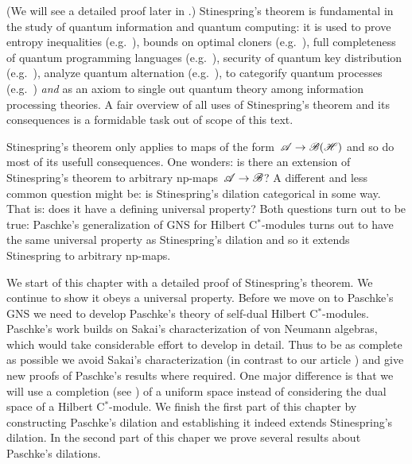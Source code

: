 \documentclass[b]{subfiles}
\begin{document}
\begin{parsec}
\begin{point}%
(We will see a detailed proof later in .)
Stinespring's theorem
is fundamental in the study
of quantum information and quantum computing:
it is used to prove entropy inequalities (e.g.~\cite{lindblad}),
bounds on optimal cloners (e.g.~\cite{werner}),
full completeness of quantum programming languages (e.g.~\cite{staton}),
security of quantum key distribution (e.g.~\cite{werner2}),
analyze quantum alternation (e.g.~\cite{prakash}),
to categorify quantum processes (e.g.~\cite{selinger}) \emph{and}
as an axiom to single out
quantum theory among information processing theories.\cite{chiribella}
A fair overview of all uses of Stinespring's theorem and its consequences
is a formidable task out of scope of this text.

Stinespring's theorem only applies
to maps of the form~$\mathscr{A} \to \mathscr{B}(\mathscr{H})$
    and so do most of its usefull consequences.
One wonders:
    is there an extension of Stinespring's theorem
    to arbitrary np-maps~$\mathscr{A} \to \mathscr{B}$?
A different and less common question might be:
    is Stinespring's dilation categorical in some way.
That is: does it have a defining universal property?
Both questions turn out to be true:
Paschke's generalization of GNS for Hilbert C$^*$-modules\cite{paschke}
    turns out to have the same universal property
        as Stinespring's dilation and so it extends Stinespring
        to arbitrary np-maps.

We start of this chapter with a detailed proof of Stinespring's theorem.
We continue to show it obeys a universal property.
Before we move on to Paschke's GNS
    we need to develop Paschke's theory of self-dual Hilbert C$^*$-modules.
Paschke's work builds on Sakai's characterization of von Neumann algebras,
    which would take considerable effort to develop in detail.
Thus to be as complete as possible
we avoid Sakai's characterization (in contrast to our
    article \cite{wwpaschke})
    and give new proofs
    of Paschke's results where required.
One major difference is that we will use
    a completion (see ) of a uniform space
    instead of considering the dual space of a Hilbert C$^*$-module.
We finish the first part of this chapter
    by constructing Paschke's dilation
    and establishing it indeed extends Stinespring's dilation.
In the second part of this chaper
    we prove several results about Paschke's dilations.
\end{point}
\end{parsec}
\end{document}
